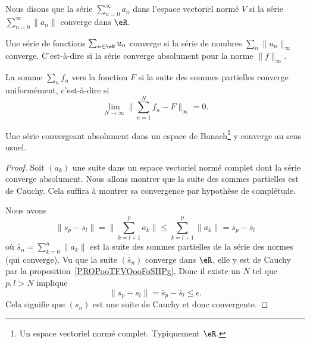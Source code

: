 \begin{definition} \label{DefVFUIXwU}
    Nous disons que la série \( \sum_{n=0}^{\infty}a_n\) dans l'espace vectoriel normé \( V\)  si la série \( \sum_{n=0}^{\infty}\| a_n \|\) converge dans \( \eR\).
\end{definition}

\begin{definition} \label{DefVBrJUxo}
    Une série de fonctions \( \sum_{n\in \eN}u_n \) converge  si la série de nombres \( \sum_n\| u_n \|_{\infty}\) converge. C'est-à-dire si la série converge absolument pour la norme \( \| f \|_{\infty}\).
\end{definition}


\begin{definition}
    La somme \( \sum_nf_n\)  vers la fonction \( F\) si la suite des sommes partielles converge uniformément, c'est-à-dire si
    \begin{equation}        \label{EqLNCJooVCTiIw}
        \lim_{N\to \infty} \| \sum_{n=1}^Nf_n-F \|_{\infty}=0.
    \end{equation}
\end{definition}

\begin{proposition} \label{PropAKCusNM}
    Une série convergeant absolument dans un espace de Banach\footnote{Un espace vectoriel normé complet. Typiquement \( \eR\).} y converge au sens usuel.
\end{proposition}

\begin{proof}
    Soit \( (a_k)\) une suite dans un espace vectoriel normé complet dont la série converge absolument. Nous allons montrer que la suite des sommes partielles est de Cauchy. Cela suffira à montrer sa convergence par hypothèse de complétude.

    Nous avons
    \begin{equation}
        \| s_p-s_l \|=\| \sum_{k=l+1}^{p}a_k\|  \leq\sum_{k=l+1}^p\| a_k \|=\bar s_p-\bar s_l
    \end{equation}
    où \( \bar s_n=\sum_{k=0}^n \| a_k \|\) est la suite des sommes partielles de la série des normes (qui converge). Vu que la suite \( (\bar s_n)\) converge dans \( \eR\), elle y est de Cauchy par la proposition~\ref{PROPooTFVOooFoSHPg}. Donc il existe un \( N\) tel que \( p,l>N\) implique
    \begin{equation}
        \| s_p-s_l \|=\bar s_p-\bar s_l\leq \epsilon.
    \end{equation}
    Cela signifie que \( (s_n)\) est une suite de Cauchy et donc convergente.
\end{proof}

